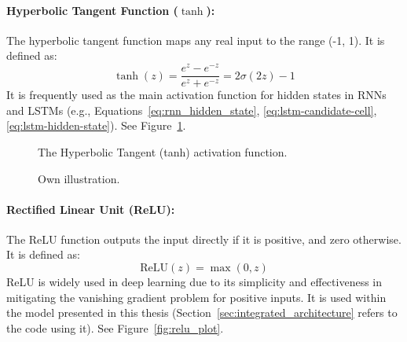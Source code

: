 \begin{appendices}
  \paragraph{Hyperbolic Tangent Function (\( \tanh \)):}
  The hyperbolic tangent function maps any real input to the range (-1, 1). It is defined as:
  \begin{equation}
    \tanh(z) = \frac{e^z - e^{-z}}{e^z + e^{-z}} = 2\sigma(2z) - 1
  \end{equation}
  It is frequently used as the main activation function for hidden states in RNNs and LSTMs (e.g., Equations~\ref{eq:rnn_hidden_state}, \ref{eq:lstm-candidate-cell}, \ref{eq:lstm-hidden-state}). See Figure~\ref{fig:tanh_plot}.

  \begin{figure}[htbp]
    \centering
    \caption[Tanh activation function]{The Hyperbolic Tangent (tanh) activation function.}
    \label{fig:tanh_plot}
    \caption*{Own illustration.}
  \end{figure}


  \paragraph{Rectified Linear Unit (ReLU):}
  The ReLU function outputs the input directly if it is positive, and zero otherwise. It is defined as:
  \begin{equation}
    \text{ReLU}(z) = \max(0, z)
  \end{equation}
  ReLU is widely used in deep learning due to its simplicity and effectiveness in mitigating the vanishing gradient problem for positive inputs. It is used within the model presented in this thesis (Section~\ref{sec:integrated_architecture} refers to the code using it). See Figure~\ref{fig:relu_plot}.


\end{appendices}
